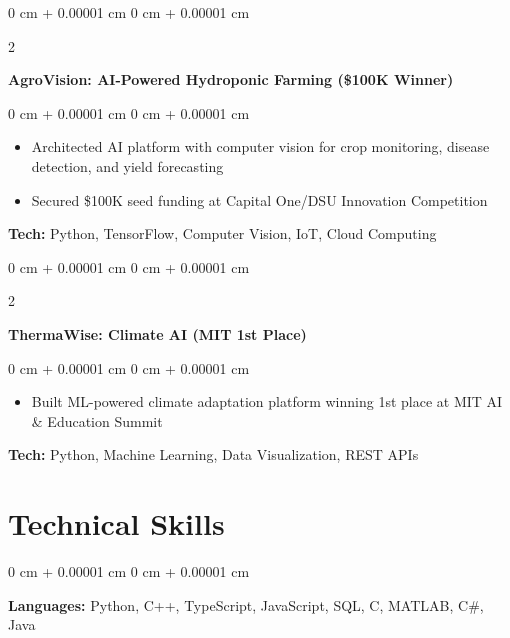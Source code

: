 \documentclass[10pt, letterpaper]{article}
\newenvironment{highlights}{
    \begin{itemize}[
        topsep=0.10 cm,
        parsep=0.10 cm,
        partopsep=0pt,
        itemsep=0pt,
        leftmargin=0 cm + 10pt
    ]
}{
    \end{itemize}
} %
\newenvironment{onecolentry}{
    \begin{adjustwidth}{
        0 cm + 0.00001 cm
    }{
        0 cm + 0.00001 cm
    }
}{
    \end{adjustwidth}
} %
\newenvironment{twocolentry}[2][]{
    \onecolentry
    \def\secondColumn{#2}
    \setcolumnwidth{\fill, 4.5 cm}
    \begin{paracol}{2}
}{
    \switchcolumn \raggedleft \secondColumn
    \end{paracol}
    \endonecolentry
} %
\begin{document}
        \begin{twocolentry}{
            2024
        }
            \textbf{AgroVision: AI-Powered Hydroponic Farming (\$100K Winner)}
        \end{twocolentry}

        \vspace{0.10 cm}
        \begin{onecolentry}
            \begin{highlights}
                \item Architected AI platform with computer vision for crop monitoring, disease detection, and yield forecasting
                \item Secured \$100K seed funding at Capital One/DSU Innovation Competition
            \end{highlights}
            \vspace{0.05 cm}
            \textbf{Tech:} Python, TensorFlow, Computer Vision, IoT, Cloud Computing
        \end{onecolentry}

        \vspace{0.2 cm}

        \begin{twocolentry}{
            2024
        }
            \textbf{ThermaWise: Climate AI (MIT 1st Place)}
        \end{twocolentry}

        \vspace{0.10 cm}
        \begin{onecolentry}
            \begin{highlights}
                \item Built ML-powered climate adaptation platform winning 1st place at MIT AI \& Education Summit
            \end{highlights}
            \vspace{0.05 cm}
            \textbf{Tech:} Python, Machine Learning, Data Visualization, REST APIs
        \end{onecolentry}




    \section{Technical Skills}

        \begin{onecolentry}
            \textbf{Languages:} Python, C++, TypeScript, JavaScript, SQL, C, MATLAB, C\#, Java
        \end{onecolentry}
\end{document}
